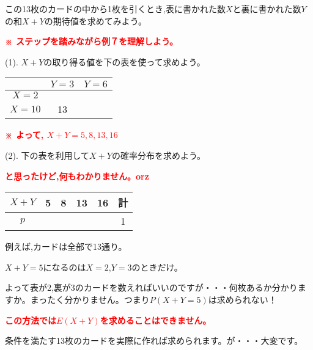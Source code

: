 \documentclass[landscape,a3paper,8pt]{ltjsarticle}
\newcommand{\RedBold}[1]{\textcolor{red}{\textbf{#1}}}
\begin{document}
\begin{multicols*}{4}
 この13枚のカードの中から1枚を引くとき,表に書かれた数$X$と裏に書かれた数$Y$の和$X+Y$の期待値を求めてみよう。

 \hfill
 \RedBold{※ ステップを踏みながら例７を理解しよう。}

 (1). $X+Y$の取り得る値を下の表を使って求めよう。
 
 \begin{ansBlockAuto}
  \begin{tabular}{|c|c|c|}\hline
   & $Y=3$ & $Y=6$\rule[-5mm]{0mm}{11mm}\\\hline
   $X=2$ & \hspace{2\zw} & \hspace{2\zw} \rule[-5mm]{0mm}{11mm}\\\hline
   $X=10$ & 13 & \rule[-5mm]{0mm}{11mm}\\\hline
  \end{tabular}
  \quad\RedBold{※ よって, $X+Y = 5, 8, 13, 16$}
 \end{ansBlockAuto}
 \vspace{1\zw}
 
 (2). 下の表を利用して$X+Y$の確率分布を求めよう。
 
 \begin{ansBlockAuto}
  \RedBold{と思ったけど,何もわかりません。orz}
  \vspace{.5\zw}

  \begin{tabular}{|c|c|c|c|c|c|}\hline
   $X+Y$ & 5 & 8 & 13 & 16 & 計 \\\hline
   $p$ & \hspace{2\zw} & \hspace{2\zw} & \hspace{2\zw} & \hspace{2\zw} & 1 \rule[-4mm]{0mm}{10mm}\\\hline
  \end{tabular}
  
  {\color{blue}\small%
  例えば,カードは全部で13通り。
  
  $X+Y=5$になるのは$X=2$,$Y=3$のときだけ。
  
  よって表が2,裏が3のカードを数えればいいのですが・・・何枚あるか分かりますか。まったく分かりません。つまり$P(X+Y=5)$は求められない！
  }
  
  \RedBold{この方法では$E(X+Y)$を求めることはできません。}

  {\color{blue}\small%
  条件を満たす13枚のカードを実際に作れば求められます。が・・・大変です。
  }
 \end{ansBlockAuto}
 

\end{multicols*}
\end{document}
